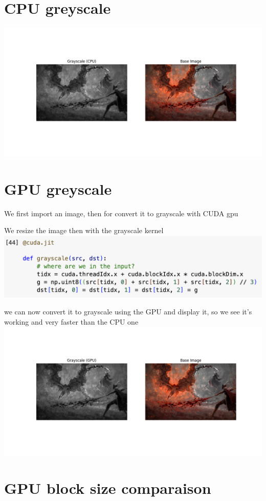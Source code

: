 \documentclass{article}
\begin{document}
\section{CPU greyscale}
\includegraphics[scale=0.5]{src/grayscale_cpu.png}


\section{GPU greyscale}
We first import an image, then for convert it to grayscale with CUDA gpu

We resize the image then with the grayscale kernel 
\includegraphics[scale=0.5]{src/grayscale.png}

we can now convert it to grayscale using the GPU and display it, so we see it's working and very faster than the CPU one
\includegraphics[scale=0.5]{src/grayscale_gpu.png}

\section{GPU block size comparaison}
\end{document}
